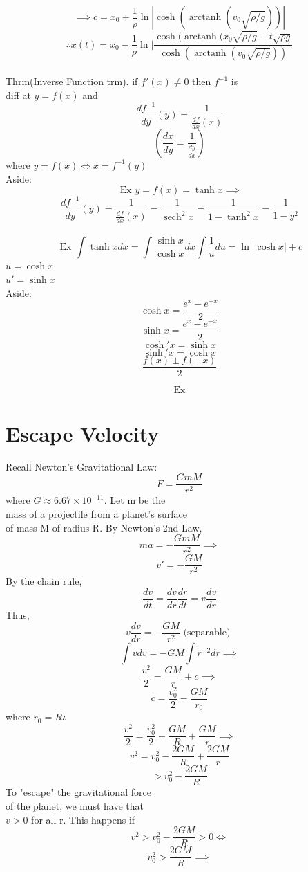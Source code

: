 \documentclass[10pt,a4paper]{article}
\DeclareMathOperator\arctanh{arctanh}
\DeclareMathOperator\sech{sech}
\begin{document}
  \[ \implies c = x_0 + \frac{1}{\rho} \ln | \cosh ( \arctanh (v_0
  \sqrt{\rho/g}))| \]
  \[ \therefore \boxed{ x(t) = x_0 - \frac{1}{\rho} \ln | \frac{\cosh
  (\arctanh (x_0 \sqrt{\rho/g} -t \sqrt{\rho g}}{ \cosh( \arctanh (v_0
  \sqrt{\rho/g}))}} \]
  \\[5mm]
  Thrm(Inverse Function trm). if \( f'(x) \neq 0 \) then \( f^{-1}\) is \\
  diff at \( y= f(x) \) and 
  \[ \frac{df^{-1}}{dy}(y) = \frac{1}{ \frac{df}{dx} (x) } \]
  \[ ( \frac{dx}{dy} = \frac{1}{ \frac{dy}{dx}}) \]
  where \( y = f(x) \iff x = f^{-1}(y) \) \\[5mm]
  Aside:
  \[ \text{ Ex } y = f(x) = \tanh x \implies \]
  \[ \frac{df^{-1}}{dy}(y) = \frac{1}{ \frac{df}{dx}(x)} =
  \frac{1}{\sech^2 x} = \frac{1}{1-\tanh^2 x} = \frac{1}{1-y^2} \]
  \\[5mm]
  \[ \text{ Ex } \int \tanh x dx = \int \frac{\sinh x}{\cosh x}dx \int
  \frac{1}{u} du = \ln|\cosh x | + c \]
  \( u = \cosh x \) \\
  \( u' = \sinh x \) \\[5mm]
  Aside: 
  \[ \cosh x = \frac{e^x - e^{-x} }{2} \]
  \[ \sinh x =\frac{e^x - e^{-x} }{2}  \]
  \[ \cosh'x = \sinh x \]
  \[ \sinh'x = \cosh x \]
  \[ \frac{f(x) \pm f(-x)}{2} \]

  \[ \text{ Ex }  \]


  \newpage
\section*{Escape Velocity}
  Recall Newton's Gravitational Law:
  \[ F = \frac{GmM}{r^2} \]
  where \( G \approx 6.67 \times 10^{-11}\). Let m be the \\
  mass of a projectile from a planet's surface \\
  of mass M of radius R. By 
  Newton's 2nd Law, 
  \[ ma = -\frac{GmM}{r^2} \implies \]
  \[ v' = -\frac{GM}{r^2} \]
  By the chain rule, 
  \[ \frac{dv}{dt} = \frac{dv}{dr} \frac{dr}{dt} = v \frac{dv}{dr} \]
  Thus, 
  \[ v \frac{dv}{dr} = -\frac{GM}{r^2} \text{ (separable) } \]
  \[ \int v dv = -GM \int r^{-2} dr \implies \]
  \[ \frac{v^2}{2} =  \frac{GM}{r} + c \implies \]
  \[ c = \frac{v_0^2}{2} - \frac{GM}{r_0} \]
  where \( r_0 = R \therefore \)
  \[ \frac{v^2}{2} = \frac{v_0^2}{2} - \frac{GM}{R} + \frac{GM}{r}
  \implies \]
  \[ v^2 = v_0^2 - \frac{2GM}{R} + \frac{2GM}{r} \]
  \[ > v_0^2 - \frac{2GM}{R} \]
  To "escape" the gravitational force \\
  of the planet, we must have that \\
  \( v>0 \) for all r. This happens if 
  \[ v^2 > v_0^2 - \frac{2GM}{R} > 0 \iff \]
  \[ v_0^2 > \frac{2GM}{R} \implies \]
\end{document}

